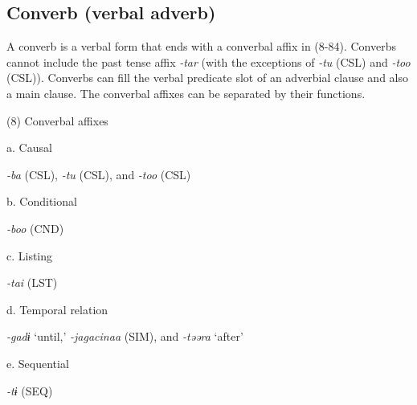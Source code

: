 \subsection{Converb (verbal adverb)}

A converb is a verbal form that ends with a converbal affix in (8-84). Converbs cannot include the past tense affix \textit{{}-tar} (with the exceptions of \textit{{}-tu} (CSL) and \textit{{}-too} (CSL)). Converbs can fill the verbal predicate slot of an adverbial clause and also a main clause. The converbal affixes can be separated by their functions.

(8)  Converbal affixes

  a.  Causal

    \textit{{}-ba} (CSL), \textit{{}-tu} (CSL), and \textit{{}-too} (CSL)

  b.  Conditional

    \textit{{}-boo} (CND)

  c.  Listing

    \textit{{}-tai} (LST)

  d.  Temporal relation

    \textit{{}-gadɨ} ‘until,’ \textit{{}-jagacinaa} (SIM), and \textit{{}-təəra} ‘after’

  e.  Sequential

    \textit{{}-tɨ} (SEQ)

